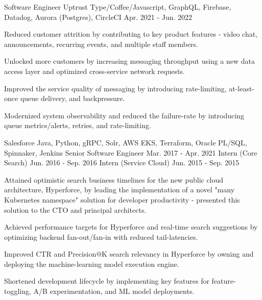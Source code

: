 
\begin{cventries}

  \cventry
    {Software Engineer} %
    {Uptrust} %
    {Type/Coffee/Javascript, GraphQL, Firebase, Datadog, Aurora (Postgres), CircleCI} %
    {Apr. 2021 - Jun. 2022} %
    {
      \begin{cvitems} %
        \item {Reduced customer attrition by contributing to key product features - video chat, announcements, recurring events, and multiple staff members.}
        \item {Unlocked more customers by increasing messaging throughput using a new data access layer and optimized cross-service network requests.}
        \item {Improved the service quality of messaging by introducing rate-limiting, at-least-once queue delivery, and backpressure.}
        \item {Modernized system observability and reduced the failure-rate by introducing queue metrics/alerts, retries, and rate-limiting.}
      \end{cvitems}
    }

  \cvthreeentry
    {Salesforce} %
    {Java, Python, gRPC, Solr, AWS EKS, Terraform, Oracle PL/SQL, Spinnaker, Jenkins} %
    {Senior Software Engineer}
    {Mar. 2017 - Apr. 2021}
    {Intern (Core Search)}
    {Jun. 2016 - Sep. 2016}
    {Intern (Service Cloud)}
    {Jun. 2015 - Sep. 2015}
    {
      \begin{cvitems} %
        \item {Attained optimistic search business timelines for the new public cloud architecture, Hyperforce, by leading the implementation of a novel "many Kubernetes namespace" solution for developer productivity - presented this solution to the CTO and principal architects.}
        \item {Achieved performance targets for Hyperforce and real-time search suggestions by optimizing backend fan-out/fan-in with reduced tail-latencies.}
        \item {Improved CTR and Precision@K search relevancy in Hyperforce by owning and deploying the machine-learning model execution engine.}
        \item {Shortened development lifecycle by implementing key features for feature-toggling, A/B experimentation, and ML model deployments.}
      \end{cvitems}
    }


\end{cventries}
